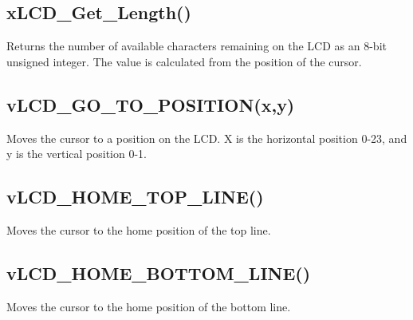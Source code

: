 \hypertarget{_usage_length}{}\subsection{x\-L\-C\-D\-\_\-\-Get\-\_\-\-Length()}\label{_usage_length}
Returns the number of available characters remaining on the L\-C\-D as an 8-\/bit unsigned integer. The value is calculated from the position of the cursor.\hypertarget{_usage_goto}{}\subsection{v\-L\-C\-D\-\_\-\-G\-O\-\_\-\-T\-O\-\_\-\-P\-O\-S\-I\-T\-I\-O\-N(x,y)}\label{_usage_goto}
Moves the cursor to a position on the L\-C\-D. X is the horizontal position 0-\/23, and y is the vertical position 0-\/1.\hypertarget{_usage_tophome}{}\subsection{v\-L\-C\-D\-\_\-\-H\-O\-M\-E\-\_\-\-T\-O\-P\-\_\-\-L\-I\-N\-E()}\label{_usage_tophome}
Moves the cursor to the home position of the top line.\hypertarget{_usage_bottomhome}{}\subsection{v\-L\-C\-D\-\_\-\-H\-O\-M\-E\-\_\-\-B\-O\-T\-T\-O\-M\-\_\-\-L\-I\-N\-E()}\label{_usage_bottomhome}
Moves the cursor to the home position of the bottom line. 